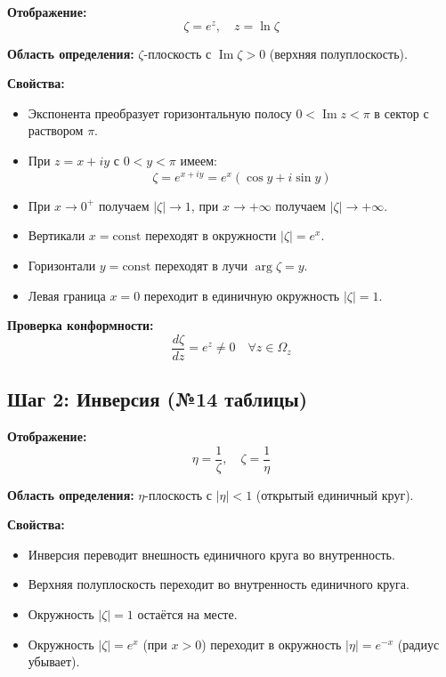 \documentclass[12pt,a4paper]{article}
\begin{document}
\textbf{Отображение:}
\begin{equation}
\zeta = e^z, \quad z = \ln \zeta
\end{equation}

\textbf{Область определения:} $\zeta$-плоскость с $\operatorname{Im} \zeta > 0$ (верхняя полуплоскость).

\textbf{Свойства:}
\begin{itemize}
    \item Экспонента преобразует горизонтальную полосу $0 < \operatorname{Im} z < \pi$ в сектор с раствором $\pi$.
    \item При $z = x + iy$ с $0 < y < \pi$ имеем:
    \[
    \zeta = e^{x+iy} = e^x(\cos y + i \sin y)
    \]
    \item При $x \to 0^+$ получаем $|\zeta| \to 1$, при $x \to +\infty$ получаем $|\zeta| \to +\infty$.
    \item Вертикали $x = \text{const}$ переходят в окружности $|\zeta| = e^x$.
    \item Горизонтали $y = \text{const}$ переходят в лучи $\arg \zeta = y$.
    \item Левая граница $x = 0$ переходит в единичную окружность $|\zeta| = 1$.
\end{itemize}

\textbf{Проверка конформности:}
\[
\frac{d\zeta}{dz} = e^z \neq 0 \quad \forall z \in \Omega_z
\]

\subsection{Шаг 2: Инверсия (№14 таблицы)}

\textbf{Отображение:}
\begin{equation}
\eta = \frac{1}{\zeta}, \quad \zeta = \frac{1}{\eta}
\end{equation}

\textbf{Область определения:} $\eta$-плоскость с $|\eta| < 1$ (открытый единичный круг).

\textbf{Свойства:}
\begin{itemize}
    \item Инверсия переводит внешность единичного круга во внутренность.
    \item Верхняя полуплоскость переходит во внутренность единичного круга.
    \item Окружность $|\zeta| = 1$ остаётся на месте.
    \item Окружность $|\zeta| = e^x$ (при $x > 0$) переходит в окружность $|\eta| = e^{-x}$ (радиус убывает).
\end{itemize}
\end{document}
